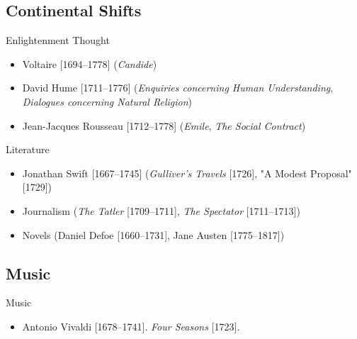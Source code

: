 \subsection{Continental Shifts}
\begin{frame}{Enlightenment Thought}
	\begin{itemize}
		\item<3->Voltaire [1694--1778] (\emph{Candide})
		\item<4->David Hume [1711--1776] (\emph{Enquiries concerning Human Understanding}, \emph{Dialogues concerning Natural Religion})
		\item<5->Jean-Jacques Rousseau [1712--1778] (\emph{Emile}, \emph{The Social Contract})
	\end{itemize}
\end{frame}

\begin{frame}{Literature}
	\begin{itemize}
		\item<3->Jonathan Swift [1667--1745] (\emph{Gulliver's Travels} [1726], "A Modest Proposal" [1729])
		\item<4->Journalism (\emph{The Tatler} [1709--1711], \emph{The Spectator} [1711--1713])
		\item<5->Novels (Daniel Defoe [1660--1731], Jane Austen [1775--1817])
	\end{itemize}
\end{frame}


\subsection{Music}
\begin{frame}{Music}
	\begin{itemize}
		\item<4->Antonio Vivaldi [1678--1741]. \emph{Four Seasons} [1723].
	\end{itemize}
\end{frame}

